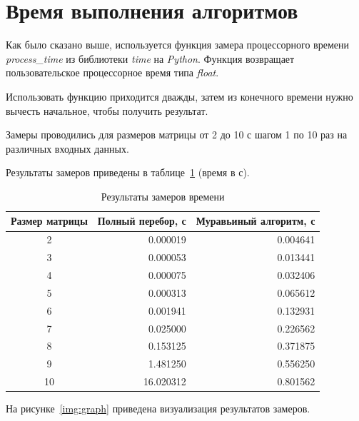 \section{Время выполнения алгоритмов}

Как было сказано выше, используется функция замера процессорного времени \textit{process\_time} из библиотеки \textit{time} на \textit{Python}. Функция возвращает пользовательское процессорное время типа \textit{float}.

Использовать функцию приходится дважды, затем из конечного времени нужно вычесть начальное, чтобы получить результат.

Замеры проводились для размеров матрицы от 2 до 10 с шагом 1 по 10 раз на различных входных данных.

Результаты замеров приведены в таблице~\ref{tbl:time_mes} (время в с).

\begin{table}[H]
	\begin{center}
		\begin{threeparttable}
			\captionsetup{justification=raggedright, singlelinecheck=off}
			\caption{Результаты замеров времени}
			\label{tbl:time_mes}
			\begin{tabular}{|c|r|r|}
				\hline
				Размер матрицы & Полный перебор, с&Муравьиный алгоритм, с\\ \hline
				2 &   0.000019 &   0.004641 \\ \hline
				3 &   0.000053 &   0.013441 \\ \hline
				4 &   0.000075 &   0.032406 \\ \hline
				5 &   0.000313 &   0.065612 \\ \hline
				6 &   0.001941 &   0.132931 \\ \hline
				7 &   0.025000 &   0.226562 \\ \hline
				8 &   0.153125 &   0.371875 \\ \hline
				9 &   1.481250 &   0.556250 \\ \hline
				10 &  16.020312 &   0.801562 \\ \hline
			\end{tabular}
		\end{threeparttable}
	\end{center}
\end{table}


На рисунке~\ref{img:graph} приведена визуализация результатов замеров.


